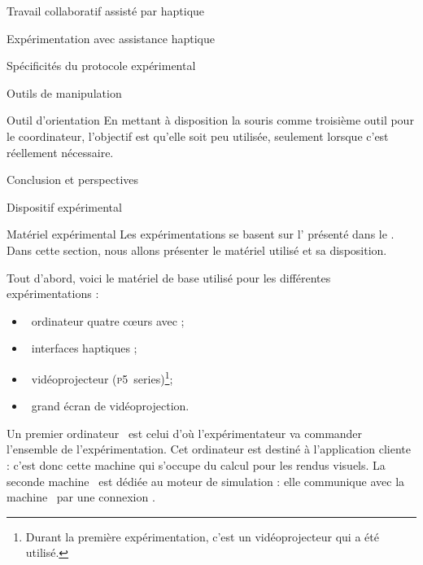 \documentclass[myfrancais]{mythesis}
\begin{document}
\begin{mychapter}{Travail collaboratif assisté par haptique}
\begin{mysection}{Expérimentation avec assistance haptique}
\begin{mysubsection}{Spécificités du protocole expérimental}
\begin{mysubsubsection}{Outils de manipulation}
\begin{myparagraph}{Outil d'orientation}
						En mettant à disposition la souris comme troisième outil pour le coordinateur, l'objectif est qu'elle soit peu utilisée, seulement lorsque c'est réellement nécessaire.
					\end{myparagraph}
				\end{mysubsubsection}
			\end{mysubsection}
		\end{mysection}
	\end{mychapter}
	\begin{mychapter}{Conclusion et perspectives}
	\end{mychapter}

	\myglossary
	\myappendix
	\begin{mychapter}{Dispositif expérimental}
		\begin{mysection}{Matériel expérimental}
			Les expérimentations se basent sur l' présenté dans le .
			Dans cette section, nous allons présenter le matériel utilisé et sa disposition.

			Tout d'abord, voici le matériel de base utilisé pour les différentes expérimentations :
			\begin{itemize}
				\item {}~ordinateur quatre cœurs \myIntelCore avec ;
				\item {}~interfaces haptiques \myOmni;
				\item {}~vidéoprojecteur \myACER (\textsc{p5}~series)\footnote{Durant la première expérimentation, c'est un vidéoprojecteur \myCasioXJ qui a été utilisé.};
				\item {}~grand écran de vidéoprojection.
			\end{itemize}

			Un premier ordinateur~ est celui d'où l'expérimentateur va commander l'ensemble de l'expérimentation.
			Cet ordinateur est destiné à l'application cliente  : c'est donc cette machine qui s'occupe du calcul pour les rendus visuels.
			La seconde machine~ est dédiée au moteur de simulation  : elle communique avec la machine~ par une connexion \myTCPIP.


\end{mysection}
\end{mychapter}
\end{document}
